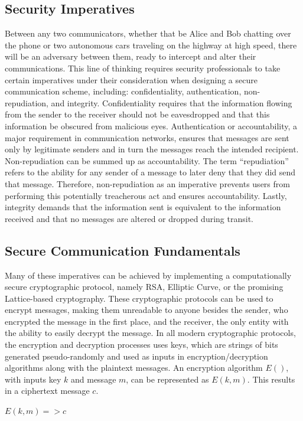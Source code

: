 \documentclass[conference,compsoc]{IEEEtran}
\begin{document}
\subsection{Security Imperatives}
Between any two communicators, whether that be Alice and Bob chatting over the phone or two autonomous cars traveling on the highway at high speed, there will be an adversary between them, ready to intercept and alter their communications. This line of thinking requires security professionals to take certain imperatives under their consideration when designing a secure communication scheme, including: confidentiality, authentication, non-repudiation, and integrity. Confidentiality requires that the information flowing from the sender to the receiver should not be eavesdropped and that this information be obscured from malicious eyes. Authentication or accountability, a major requirement in communication networks, ensures that messages are sent only by legitimate senders and in turn the messages reach the intended recipient. Non-repudiation can be summed up as accountability. The term “repudiation” refers to the ability for any sender of a message to later deny that they did send that message. Therefore, non-repudiation as an imperative prevents users from performing this potentially treacherous act and ensures accountability. Lastly, integrity demands that the information sent is equivalent to the information received and that no messages are altered or dropped during transit.

\subsection{Secure Communication Fundamentals}
Many of these imperatives can be achieved by implementing a computationally secure cryptographic protocol, namely RSA, Elliptic Curve, or the promising Lattice-based cryptography. These cryptographic protocols can be used to encrypt messages, making them unreadable to anyone besides the sender, who encrypted the message in the first place, and the receiver, the only entity with the ability to easily decrypt the message. In all modern cryptographic protocols, the encryption and decryption processes uses keys, which are strings of bits generated pseudo-randomly and used as inputs in encryption/decryption algorithms along with the plaintext messages. An encryption algorithm $E()$, with inputs key $k$ and message $m$, can be represented as $E(k, m)$. This results in a ciphertext message $c$.

\begin{center}
\large $E(k, m) => c$
\break
\end{center}
\end{document}
